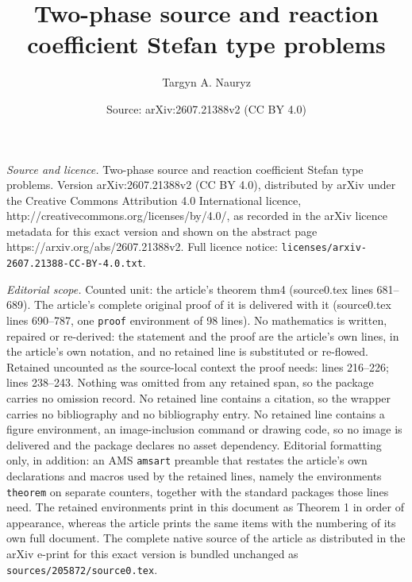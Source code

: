 \documentclass[10pt,a4paper]{amsart}
\title{Two-phase source and reaction coefficient Stefan type problems}
\author{Targyn A. Nauryz}
\date{Source: arXiv:2607.21388v2 (CC BY 4.0)}
\begin{document}
\maketitle

\noindent\emph{Source and licence.} Two-phase source and reaction coefficient Stefan type problems. Version arXiv:2607.21388v2 (CC BY 4.0), distributed by arXiv under the Creative Commons Attribution 4.0 International licence, http://creativecommons.org/licenses/by/4.0/, as recorded in the arXiv licence metadata for this exact version and shown on the abstract page https://arxiv.org/abs/2607.21388v2. Full licence notice: \texttt{licenses/arxiv-2607.21388-CC-BY-4.0.txt}.\par\smallskip

\noindent\textit{Editorial scope.} Counted unit: the article's theorem thm4 (source0.tex lines 681--689). The article's complete original proof of it is delivered with it (source0.tex lines 690--787, one \texttt{proof} environment of 98 lines). No mathematics is written, repaired or re-derived: the statement and the proof are the article's own lines, in the article's own notation, and no retained line is substituted or re-flowed.  Retained uncounted as the source-local context the proof needs: lines 216--226; lines 238--243.  Nothing was omitted from any retained span, so the package carries no omission record.  No retained line contains a citation, so the wrapper carries no bibliography and no bibliography entry.  No retained line contains a figure environment, an image-inclusion command or drawing code, so no image is delivered and the package declares no asset dependency.  Editorial formatting only, in addition: an AMS \texttt{amsart} preamble that restates the article's own declarations and macros used by the retained lines, namely the environments \texttt{theorem} on separate counters, together with the standard packages those lines need.  The retained environments print in this document as Theorem 1 in order of appearance, whereas the article prints the same items with the numbering of its own full document.  The complete native source of the article as distributed in the arXiv e-print for this exact version is bundled unchanged as \texttt{sources/205872/source0.tex}.
\end{document}
